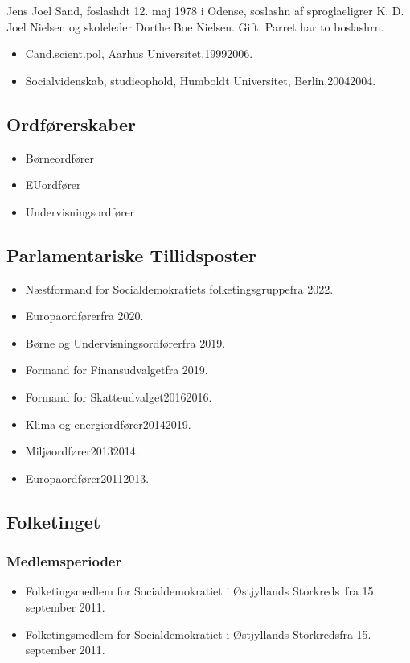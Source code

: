 \documentclass[11pt, a4paper]{awesome-cv}
\begin{document}
\makecvheader[R]
\makelettertitle
\begin{cvletter}
Jens Joel Sand, foslashdt 12. maj 1978 i Odense, soslashn af sproglaeligrer K. D. Joel Nielsen og skoleleder Dorthe Boe Nielsen. Gift. Parret har to boslashrn.

\begin{itemize}
\item Cand.scient.pol, Aarhus Universitet,19992006.
\item Socialvidenskab, studieophold, Humboldt Universitet, Berlin,20042004.
\end{itemize}
\subsection*{Ordførerskaber}
\begin{itemize}
\item Børneordfører
\item EUordfører
\item Undervisningsordfører
\end{itemize}
\subsection*{Parlamentariske Tillidsposter}
\begin{itemize}
\item Næstformand for Socialdemokratiets folketingsgruppefra 2022.
\item Europaordførerfra 2020.
\item Børne og Undervisningsordførerfra 2019.
\item Formand for Finansudvalgetfra 2019.
\item Formand for Skatteudvalget20162016.
\item Klima og energiordfører20142019.
\item Miljøordfører20132014.
\item Europaordfører20112013.
\end{itemize}
\subsection*{Folketinget}
\subsubsection*{Medlemsperioder}
\begin{itemize}
\item Folketingsmedlem for Socialdemokratiet i Østjyllands Storkreds fra 15. september 2011.
\item Folketingsmedlem for Socialdemokratiet i Østjyllands Storkredsfra 15. september 2011.
\end{itemize}

\end{cvletter}
\end{document}
